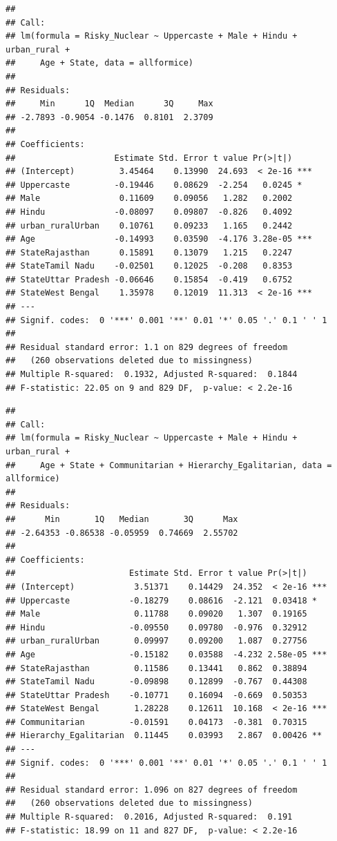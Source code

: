 \documentclass[
]{article}
\begin{document}
\begin{verbatim}
## 
## Call:
## lm(formula = Risky_Nuclear ~ Uppercaste + Male + Hindu + urban_rural + 
##     Age + State, data = allformice)
## 
## Residuals:
##     Min      1Q  Median      3Q     Max 
## -2.7893 -0.9054 -0.1476  0.8101  2.3709 
## 
## Coefficients:
##                    Estimate Std. Error t value Pr(>|t|)    
## (Intercept)         3.45464    0.13990  24.693  < 2e-16 ***
## Uppercaste         -0.19446    0.08629  -2.254   0.0245 *  
## Male                0.11609    0.09056   1.282   0.2002    
## Hindu              -0.08097    0.09807  -0.826   0.4092    
## urban_ruralUrban    0.10761    0.09233   1.165   0.2442    
## Age                -0.14993    0.03590  -4.176 3.28e-05 ***
## StateRajasthan      0.15891    0.13079   1.215   0.2247    
## StateTamil Nadu    -0.02501    0.12025  -0.208   0.8353    
## StateUttar Pradesh -0.06646    0.15854  -0.419   0.6752    
## StateWest Bengal    1.35978    0.12019  11.313  < 2e-16 ***
## ---
## Signif. codes:  0 '***' 0.001 '**' 0.01 '*' 0.05 '.' 0.1 ' ' 1
## 
## Residual standard error: 1.1 on 829 degrees of freedom
##   (260 observations deleted due to missingness)
## Multiple R-squared:  0.1932, Adjusted R-squared:  0.1844 
## F-statistic: 22.05 on 9 and 829 DF,  p-value: < 2.2e-16
\end{verbatim}

\begin{verbatim}
## 
## Call:
## lm(formula = Risky_Nuclear ~ Uppercaste + Male + Hindu + urban_rural + 
##     Age + State + Communitarian + Hierarchy_Egalitarian, data = allformice)
## 
## Residuals:
##      Min       1Q   Median       3Q      Max 
## -2.64353 -0.86538 -0.05959  0.74669  2.55702 
## 
## Coefficients:
##                       Estimate Std. Error t value Pr(>|t|)    
## (Intercept)            3.51371    0.14429  24.352  < 2e-16 ***
## Uppercaste            -0.18279    0.08616  -2.121  0.03418 *  
## Male                   0.11788    0.09020   1.307  0.19165    
## Hindu                 -0.09550    0.09780  -0.976  0.32912    
## urban_ruralUrban       0.09997    0.09200   1.087  0.27756    
## Age                   -0.15182    0.03588  -4.232 2.58e-05 ***
## StateRajasthan         0.11586    0.13441   0.862  0.38894    
## StateTamil Nadu       -0.09898    0.12899  -0.767  0.44308    
## StateUttar Pradesh    -0.10771    0.16094  -0.669  0.50353    
## StateWest Bengal       1.28228    0.12611  10.168  < 2e-16 ***
## Communitarian         -0.01591    0.04173  -0.381  0.70315    
## Hierarchy_Egalitarian  0.11445    0.03993   2.867  0.00426 ** 
## ---
## Signif. codes:  0 '***' 0.001 '**' 0.01 '*' 0.05 '.' 0.1 ' ' 1
## 
## Residual standard error: 1.096 on 827 degrees of freedom
##   (260 observations deleted due to missingness)
## Multiple R-squared:  0.2016, Adjusted R-squared:  0.191 
## F-statistic: 18.99 on 11 and 827 DF,  p-value: < 2.2e-16
\end{verbatim}
\end{document}
